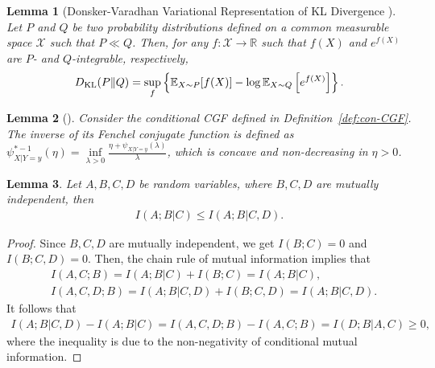 \documentclass[onecolumn,romanappendices,10pt]{IEEEtran}
\newtheorem{lemma}{Lemma}
\newcommand{\Xcal}{{\mathcal X}}
\newcommand{\EE}{{\mathbb{E}}}
\newcommand{\RR}{{\mathbb{R}}}
\begin{document}
	\begin{lemma}[Donsker-Varadhan Variational Representation of KL Divergence {\cite[Theorem~4.6]{polyanskiy2025information}}]\label{lem:DV-formula}
		Let $P$ and $Q$ be two probability distributions defined on a common measurable space $\Xcal$ such that $P \ll Q$. Then, for any $f : \Xcal \to \RR$ such that $f(X)$ and $e^{f(X)}$ are $P$- and $Q$-integrable, respectively,
		\begin{align}
			D_{\textnormal{KL}}(P \| Q) = \sup_f \left\{ \EE_{X \sim P} [f(X)] - \log \EE_{X \sim Q} \left[ e^{f(X)} \right] \right\}.
		\end{align}
	\end{lemma}
	
	\begin{lemma}[{\cite[Section~IV-B]{zhou2022individually}}] \label{lem:inv_conj}
		Consider the conditional CGF defined in Definition~\ref{def:con-CGF}. The inverse of its Fenchel conjugate function is defined as $\psi^{*-1}_{X|Y=y}(\eta) = \inf\limits_{\lambda>0} \frac{\eta + \psi_{X|Y=y}(\lambda)}{\lambda}$, which is concave and non-decreasing in $\eta > 0$.
	\end{lemma}
	
	\begin{lemma} \label{lem:more-info-by-condi}
		Let $A, B, C, D$ be random variables, where $B, C, D$ are mutually independent, then
		\begin{equation*}
			\begin{aligned}
				I( A; B | C ) \leq I( A; B | C, D ).
			\end{aligned}
		\end{equation*}
	\end{lemma}
	\begin{proof}
		Since $B, C, D$ are mutually independent, we get $I(B; C) = 0$ and $I(B; C, D) = 0$. Then, the chain rule of mutual information implies that
		\begin{align}
			&I(A, C; B) = I( A; B | C ) + I(B; C) = I( A; B | C ), \\
			&I( A, C, D; B ) = I( A; B | C, D ) + I(B; C, D) = I( A; B | C, D ).
		\end{align}
		It follows that
		\begin{equation*}
			\begin{aligned}
				I( A; B | C, D ) - I( A; B | C ) = I( A, C, D; B ) - I(A, C; B) = I( D; B | A, C ) \geq 0,
			\end{aligned}
		\end{equation*}
		where the inequality is due to the non-negativity of conditional mutual information. 
	\end{proof}
	
\end{document}
